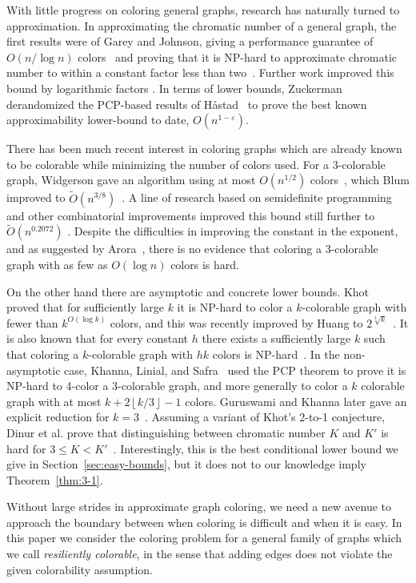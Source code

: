 \documentclass[10pt]{article}
\begin{document}
With little progress on coloring general graphs, research has naturally turned
to approximation. In approximating the chromatic number of a general graph, the
first results were of Garey and Johnson, giving a performance guarantee of
$O(n/\log n)$ colors~\cite{Johnson74} and proving that it is NP-hard to
approximate chromatic number to within a constant factor less than
two~\cite{GJ76}. Further work improved this bound by logarithmic factors
\cite{BR90,Ha93}. In terms of lower bounds, Zuckerman~\cite{Zu07} derandomized
the PCP-based results of H{\aa}stad~\cite{Ha99} to prove the best known
approximability lower-bound to date, $O(n^{1-\varepsilon})$.

There has been much recent interest in coloring graphs which are already known
to be colorable while minimizing the number of colors used. For a 3-colorable
graph, Widgerson gave an algorithm using at most $O(n^{1/2})$
colors~\cite{Wi83}, which Blum improved to $\tilde{O}(n^{3/8})$~\cite{Blum94}.
A line of research based on semidefinite programming and other combinatorial
improvements improved this bound still further to $\tilde{O}(n^{0.2072})$
\cite{Ka98,Blum97,Arora06,Chl09, KT12}. Despite the difficulties in improving
the constant in the exponent, and as suggested by Arora~\cite{Arora11}, there
is no evidence that coloring a 3-colorable graph with as few as $O(\log n)$
colors is hard.

On the other hand there are asymptotic and concrete lower bounds.
Khot~\cite{Khot01} proved that for sufficiently large $k$ it is NP-hard to
color a $k$-colorable graph with fewer than $k^{O(\log{k})}$ colors, and this
was recently improved by Huang to $2^{\sqrt[3]{k}}$~\cite{Huang13}. It is also
known that for every constant $h$ there exists a sufficiently large $k$ such
that coloring a $k$-colorable graph with $hk$ colors is NP-hard~\cite{DMR06}.
In the non-asymptotic case, Khanna, Linial, and Safra~\cite{KLS00} used the PCP
theorem to prove it is NP-hard to 4-color a 3-colorable graph, and more
generally to color a $k$ colorable graph with at most $k + 2\left \lfloor k/3
\right \rfloor - 1$ colors. Guruswami and Khanna later gave an explicit
reduction for $k=3$~\cite{GuKh2000}. Assuming a variant of Khot's 2-to-1
conjecture, Dinur et al. prove that distinguishing between chromatic number $K$
and $K'$ is hard for $3 \leq K < K'$~\cite{DMR06}.  Interestingly, this is the
best conditional lower bound we give in Section~\ref{sec:easy-bounds}, but it
does not to our knowledge imply Theorem~\ref{thm:3-1}.

Without large strides in approximate graph coloring, we need a new avenue to
approach the boundary between when coloring is difficult and when it is easy.
In this paper we consider the coloring problem for a general family of graphs
which we call \emph{resiliently colorable}, in the sense that adding edges does
not violate the given colorability assumption. 
\end{document}
